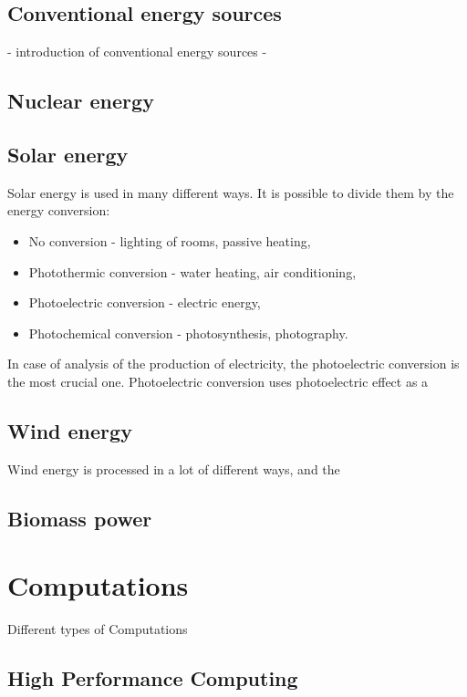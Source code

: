 \subsection{Conventional energy sources}

- introduction of conventional energy sources
- 

\subsection{Nuclear energy}

\subsection{Solar energy}

Solar energy is used in many different ways. It is possible to divide them by the energy conversion:

\begin{itemize}
    \item No conversion - lighting of rooms, passive heating,
    \item Photothermic conversion - water heating, air conditioning,
    \item Photoelectric conversion - electric energy,
    \item Photochemical conversion - photosynthesis, photography.
\end{itemize}

In case of analysis of the production of electricity, the photoelectric conversion is the most crucial one.
Photoelectric conversion uses photoelectric effect as a 

\subsection{Wind energy}

Wind energy is processed in a lot of different ways, and the 

\subsection{Biomass power}

\section{Computations}

Different types of Computations

\subsection{High Performance Computing}

